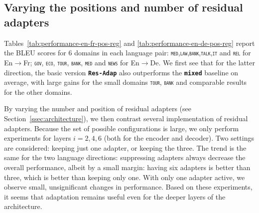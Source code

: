 \documentclass[11pt,a4paper]{article}
\newcommand{\fyDone}[1]{\done[FY]\Todo[FY:]{\textcolor{orange}{#1}}}
\newcommand{\fyFuture}[1]{\done[FY]\Todo[FY:]{\textcolor{red}{#1}}}
\newcommand{\domain}[1]{\texttt{\textsc{#1}}}
\newcommand{\system}[1]{\texttt{\textbf{#1}}}
\begin{document}

\subsection{Varying the positions and number of residual adapters}
Tables~\ref{tab:performance-en-fr-pos-reg} and \ref{tab:performance-en-de-pos-reg} report the BLEU scores for 6 domains in each language pair: \domain{med},\domain{law},\domain{bank},\domain{talk},\domain{it} and \domain{rel} for En$\rightarrow$Fr; \domain{gov}, \domain{eco}, \domain{tour}, \domain{bank}, \domain{med} and \domain{news} for En$\rightarrow$De. We first see that for the latter direction, the basic version \system{Res-Adap} also outperforms the \system{mixed} baseline on average, with large gains for the small domains \domain{tour}, \domain{bank} and comparable results for the other domains.
\fyFuture{Full FT for en->DE ? }

By varying the number and position of residual adapters (see Section~\ref{ssec:architecture}), we then contrast several implementation of residual adapters. \fyDone{Fix style here} Because the set of possible configurations is large, we only perform experiments for layers $i= 2, 4, 6$ (both for the encoder and decoder). Two settings are considered: keeping just one adapter, or keeping the three. The trend is the same for the two language directions: suppressing adapters always decrease the overall performance, albeit by a small margin: having six adapters is better than three, which is better than keeping only one. With only one adapter active, we observe small, unsignificant changes in performance. Based on these experiments, it seems that adaptation remains useful even for the deeper layers of the architecture.
\end{document}
